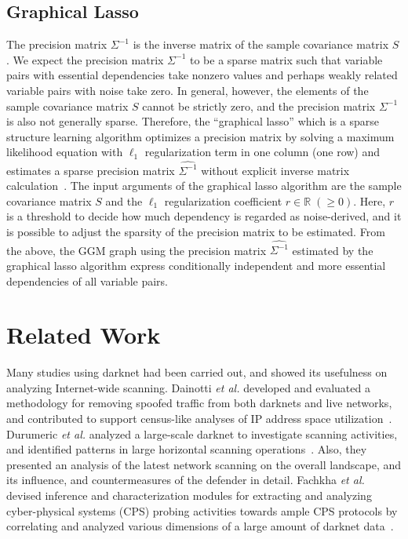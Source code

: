\documentclass[conference]{IEEEtran}
\begin{document}
\subsection{Graphical Lasso}
The precision matrix $\Sigma^{-1}$ is the inverse matrix of the sample covariance matrix $S$.
We expect the precision matrix $\Sigma^{-1}$ to be a sparse matrix such that variable pairs with essential dependencies take nonzero values and perhaps weakly related variable pairs with noise take zero.
In general, however, the elements of the sample covariance matrix $S$ cannot be strictly zero, and the precision matrix $\Sigma^{-1}$ is also not generally sparse.
Therefore, the ``graphical lasso'' which is a sparse structure learning algorithm optimizes a precision matrix by solving a maximum likelihood equation with $\ell_1$ regularization term in one column (one row) and estimates a sparse precision matrix $\hat{\Sigma^{-1}}$ without explicit inverse matrix calculation~\cite{Friedman}.
The input arguments of the graphical lasso algorithm are the sample covariance matrix $S$ and the $\ell_1$ regularization coefficient $r\in\mathbb{R}\;(\geq 0)$.
Here, $r$ is a threshold to decide how much dependency is regarded as noise-derived, and it is possible to adjust the sparsity of the precision matrix to be estimated.
From the above, the GGM graph using the precision matrix $\hat{\Sigma^{-1}}$ estimated by the graphical lasso algorithm express conditionally independent and more essential dependencies of all variable pairs.



\section{Related Work}
Many studies using darknet had been carried out, and showed its usefulness on analyzing Internet-wide scanning.
Dainotti {\it et al.} developed and evaluated a methodology for removing spoofed traffic from both darknets and live networks, and contributed to support census-like analyses of IP address space utilization~\cite{Dainotti}.
Durumeric {\it et al.} analyzed a large-scale darknet to investigate scanning activities, and identified patterns in large horizontal scanning operations~\cite{Durumeric}.
Also, they presented an analysis of the latest network scanning on the overall landscape, and its influence, and countermeasures of the defender in detail.
Fachkha {\it et al.} devised inference and characterization modules for extracting and analyzing cyber-physical systems (CPS) probing activities towards ample CPS protocols by correlating and analyzed various dimensions of a large amount of darknet data~\cite{Fachkha}.
\end{document}
